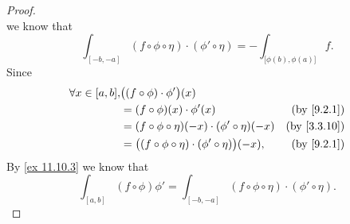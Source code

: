 \begin{proof}
\[  \]
  we know that
  \[
    \int_{[-b, -a]} (f \circ \phi \circ \eta) \cdot (\phi' \circ \eta) = -\int_{\big[\phi(b), \phi(a)\big]} f.
  \]
  Since
  \begin{align*}
    \forall x \in [a, b], & \big((f \circ \phi) \cdot \phi'\big)(x)                                                         \\
                          & = (f \circ \phi)(x) \cdot \phi'(x)                                  & \text{(by \cref{9.2.1})}  \\
                          & = (f \circ \phi \circ \eta)(-x) \cdot (\phi' \circ \eta)(-x)        & \text{(by \cref{3.3.10})} \\
                          & = \big((f \circ \phi \circ \eta) \cdot (\phi' \circ \eta)\big)(-x), & \text{(by \cref{9.2.1})}
  \end{align*}
  By \cref{ex 11.10.3} we know that
  \[
    \int_{[a, b]} (f \circ \phi) \phi' = \int_{[-b, -a]} (f \circ \phi \circ \eta) \cdot (\phi' \circ \eta).
  \]
\end{proof}